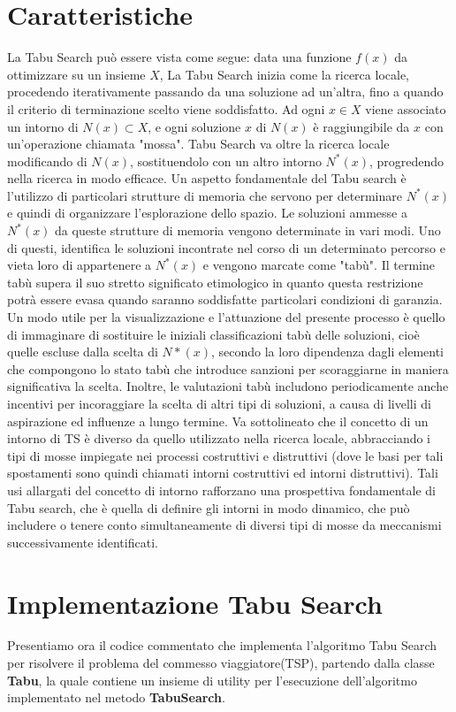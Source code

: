 \section{Caratteristiche}
La Tabu Search può essere vista come segue: data una funzione $f(x)$ da ottimizzare su un insieme $X$, La Tabu Search inizia come la ricerca locale, procedendo iterativamente passando da una soluzione ad un'altra, fino a quando il criterio di terminazione scelto viene soddisfatto. Ad ogni $x \in X$ viene associato un intorno di $N(x) \subset X$, e ogni soluzione $x$ di $N(x)$ è raggiungibile da $x$ con un'operazione chiamata "mossa". Tabu Search va oltre la ricerca locale modificando di $N(x)$, sostituendolo con un altro intorno $N^*(x)$, progredendo nella ricerca in modo efficace. Un aspetto fondamentale del Tabu search è l'utilizzo di particolari strutture di memoria che servono per determinare $N^*(x)$ e quindi di organizzare l'esplorazione dello spazio.
Le soluzioni ammesse a $N^*(x)$ da queste strutture di memoria vengono determinate in vari modi. Uno di questi, identifica le soluzioni incontrate nel corso di un determinato percorso  e vieta loro di appartenere a $N^*(x)$ e vengono marcate come "tabù".
Il termine tabù supera il suo stretto significato etimologico in quanto questa restrizione potrà essere evasa quando saranno soddisfatte particolari condizioni di garanzia. Un modo utile per la visualizzazione e l'attuazione del presente processo è quello di immaginare di sostituire le iniziali classificazioni tabù delle soluzioni, cioè quelle escluse dalla scelta di $N*(x)$, secondo la loro dipendenza dagli elementi che compongono lo stato tabù che introduce sanzioni per scoraggiarne in maniera significativa la scelta. Inoltre, le valutazioni tabù includono periodicamente anche incentivi per incoraggiare la scelta di altri tipi di soluzioni, a causa di livelli di aspirazione ed influenze a lungo termine. Va sottolineato che il concetto di un intorno di TS è diverso da quello utilizzato nella ricerca locale, abbracciando i tipi di mosse impiegate nei processi costruttivi e distruttivi (dove le basi per tali spostamenti sono quindi chiamati intorni costruttivi ed intorni distruttivi). Tali usi allargati del concetto di intorno rafforzano una prospettiva fondamentale di Tabu search, che è quella di definire gli intorni in modo dinamico, che può includere o tenere conto simultaneamente di diversi tipi di mosse da meccanismi successivamente identificati.

\section{Implementazione Tabu Search}
Presentiamo ora il codice commentato che implementa l'algoritmo Tabu Search per risolvere il problema del commesso viaggiatore(TSP), partendo dalla classe \textbf{Tabu}, la quale contiene un insieme di utility per l'esecuzione dell'algoritmo implementato nel metodo \textbf{TabuSearch}. 

